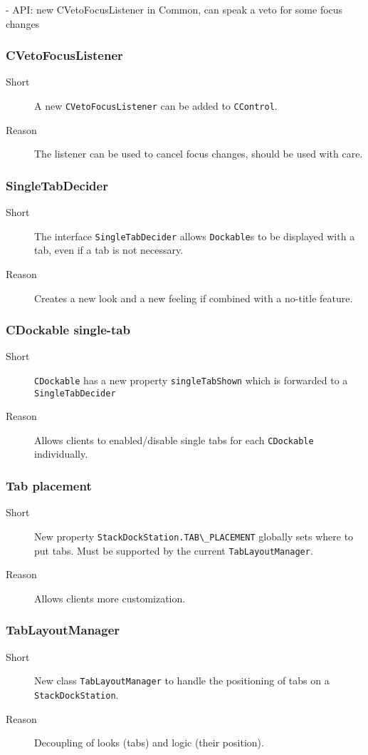 \documentclass[a4paper,10pt]{article}
\newcommand{\src}[1]{\lstinline[basicstyle=\normalsize\ttfamily,keywordstyle=\normalsize\ttfamily,identifierstyle=\normalsize\ttfamily]|#1|}
\newcommand{\short}{\item[Short]}
\newcommand{\why}{\item[Reason]}
\begin{document}
- API: new CVetoFocusListener in Common, can speak a veto for some focus changes
\subsubsection{CVetoFocusListener}
\begin{description}
 \short A new \src{CVetoFocusListener} can be added to \src{CControl}.
 \why The listener can be used to cancel focus changes, should be used with care.
\end{description}

\subsubsection{SingleTabDecider}
\begin{description}
 \short The interface \src{SingleTabDecider} allows \src{Dockable}s to be displayed with a tab, even if a tab is not necessary.
 \why Creates a new look and a new feeling if combined with a no-title feature.
\end{description}

\subsubsection{CDockable single-tab}
\begin{description}
 \short \src{CDockable} has a new property \src{singleTabShown} which is forwarded to a \src{SingleTabDecider}
 \why Allows clients to enabled/disable single tabs for each \src{CDockable} individually.
\end{description}

\subsubsection{Tab placement}
\begin{description}
 \short New property \src{StackDockStation.TAB\_PLACEMENT} globally sets where to put tabs. Must be supported by the current \src{TabLayoutManager}.
 \why Allows clients more customization.
\end{description}

\subsubsection{TabLayoutManager}
\begin{description}
 \short New class \src{TabLayoutManager} to handle the positioning of tabs on a \src{StackDockStation}.
 \why Decoupling of looks (tabs) and logic (their position). 
\end{description}
\end{document}
